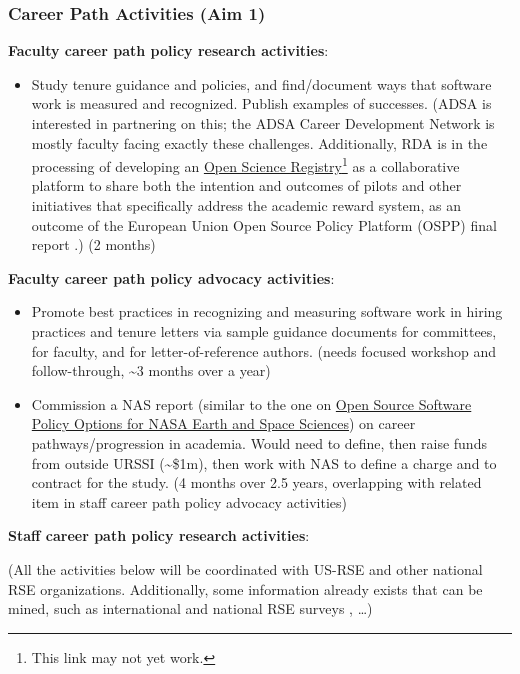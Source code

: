 \documentclass[
]{book}
\providecommand{\tightlist}{%
  \setlength{\itemsep}{0pt}\setlength{\parskip}{0pt}}
\begin{document}
\hypertarget{career-path-activities-aim-1}{%
\subsubsection{Career Path Activities (Aim 1)}\label{career-path-activities-aim-1}}

\textbf{Faculty career path policy research activities}:

\begin{itemize}
\tightlist
\item
  Study tenure guidance and policies, and find/document ways that software work is measured
  and recognized. Publish examples of successes.
  (ADSA is interested in partnering on this; the ADSA Career Development Network is mostly faculty facing exactly these challenges.
  Additionally, RDA is in the processing of developing an \href{www.openscienceregistry.org}{Open Science Registry}\footnote{This link may not yet work.}
  as a collaborative platform to share both the intention and outcomes of pilots
  and other initiatives that specifically address the academic reward system, as an outcome of the
  European Union Open Source Policy Platform (OSPP) final report \citep{OSPP_report}.) (2 months)
\end{itemize}

\textbf{Faculty career path policy advocacy activities}:

\begin{itemize}
\item
  Promote best practices in recognizing and measuring software work in hiring practices and
  tenure letters via sample guidance documents for committees, for faculty, and for
  letter-of-reference authors. (needs focused workshop and follow-through, \textasciitilde3 months over a year)
\item
  Commission a NAS report (similar to the one on \href{https://www.nap.edu/read/25217/chapter/1}{Open Source Software Policy Options for NASA
  Earth and Space Sciences}) on career pathways/progression
  in academia. Would need to define, then raise funds from
  outside URSSI (\textasciitilde\$1m), then work with NAS to define a charge and to contract for the study.
  (4 months over 2.5 years, overlapping with related item in staff career path policy advocacy activities)
\end{itemize}

\textbf{Staff career path policy research activities}:

(All the activities below will be coordinated with US-RSE and other national RSE organizations. Additionally, some information already exists that can be mined, such as international and national RSE surveys \citep{rse-survey}, \ldots)
\end{document}

